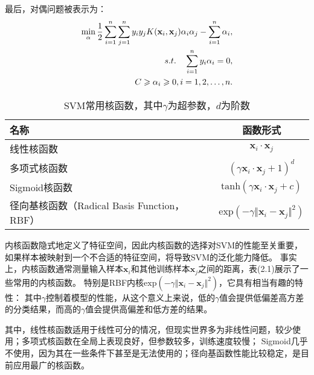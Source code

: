 最后，对偶问题被表示为：
\begin{align}
    \min_\alpha\frac{1}{2}\sum_{i=1}^n\sum_{j=1}^ny_iy_jK(\mathbf{x}_i,\mathbf{x}_j)\alpha_i\alpha_j-\sum_{i=1}^n\alpha_i, \\
    s.t.\quad \sum_{i=1}^ny_i\alpha_i=0, \notag \\
    C\geq\alpha_i\geq0,i=1,2,\ldots,n.\notag
\end{align}

\begin{table}[ht]
    \centering
    \caption{SVM常用核函数，其中$\gamma$为超参数，$d$为阶数}
    \begin{tabular}{lc}
        \hline
        {名称} & {函数形式}\\
        \hline
        {线性核函数} & {$\mathbf{x}_i\cdot\mathbf{x}_j$}\\
        {多项式核函数} & {$(\gamma\mathbf{x}_i\cdot\mathbf{x}_j+1)^d$}\\
        {Sigmoid核函数} & {$\mathrm{tanh}(\gamma\mathbf{x}_i\cdot\mathbf{x}_j+c)$}\\
        {径向基核函数（Radical Basis Function，RBF）} & {$\mathrm{exp}(-\gamma\Vert\mathbf{x}_i-\mathbf{x}_j\Vert^2)$}\\
        \hline
    \end{tabular}
\end{table}

内核函数隐式地定义了特征空间，因此内核函数的选择对SVM的性能至关重要，如果样本被映射到一个不合适的特征空间，将导致SVM的泛化能力降低。
事实上，内核函数通常测量输入样本$\mathbf{x}_i$和其他训练样本$\mathbf{x}_j$之间的距离，表(2.1)展示了一些常用的内核函数。
特别是RBF内核$\mathrm{exp}(-\gamma\Vert\mathbf{x}_i-\mathbf{x}_j\Vert^2)$，它具有相当有趣的特性：
其中$\gamma$控制着模型的性能，从这个意义上来说，低的$\gamma$值会提供低偏差高方差的分类结果，而高的$\gamma$值会提供高偏差和低方差的结果。

其中，线性核函数适用于线性可分的情况，但现实世界多为非线性问题，较少使用；多项式核函数在全局上表现良好，但参数较多，训练速度较慢；
Sigmoid几乎不使用，因为其在一些条件下甚至是无法使用的；径向基函数性能比较稳定，是目前应用最广的核函数。